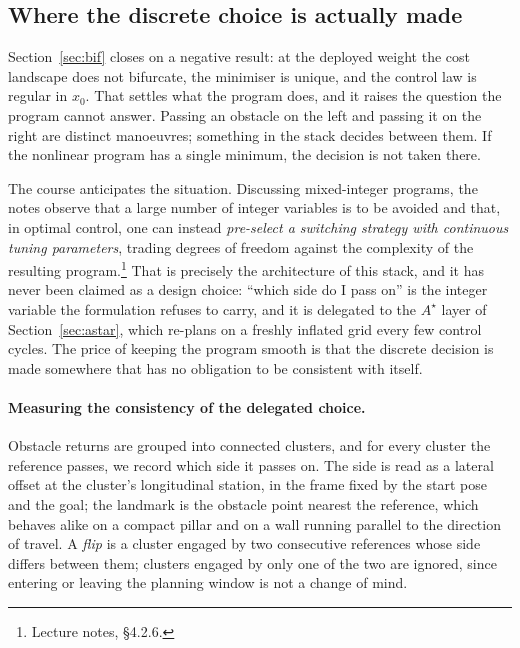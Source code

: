 \documentclass[11pt,a4paper]{article}
\newcommand{\astar}{$A^\star$}
\begin{document}
\subsection{Where the discrete choice is actually made}
\label{sec:homotopy}

Section~\ref{sec:bif} closes on a negative result: at the deployed weight the cost landscape does not
bifurcate, the minimiser is unique, and the control law is regular in $x_0$. That settles what the program
does, and it raises the question the program cannot answer. Passing an obstacle on the left and passing it on
the right are distinct manoeuvres; something in the stack decides between them. If the nonlinear program has
a single minimum, the decision is not taken there.

The course anticipates the situation. Discussing mixed-integer programs, the notes observe that a large
number of integer variables is to be avoided and that, in optimal control, one can instead
\emph{pre-select a switching strategy with continuous tuning parameters}, trading degrees of freedom against
the complexity of the resulting program.\footnote{Lecture notes, \S4.2.6.} That is precisely the architecture
of this stack, and it has never been claimed as a design choice: ``which side do I pass on'' is the integer
variable the formulation refuses to carry, and it is delegated to the \astar{} layer of
Section~\ref{sec:astar}, which re-plans on a freshly inflated grid every few control cycles. The price of
keeping the program smooth is that the discrete decision is made somewhere that has no obligation to be
consistent with itself.

\paragraph{Measuring the consistency of the delegated choice.}
Obstacle returns are grouped into connected clusters, and for every cluster the reference passes, we record
which side it passes on. The side is read as a lateral offset at the cluster's longitudinal station, in the
frame fixed by the start pose and the goal; the landmark is the obstacle point nearest the reference, which
behaves alike on a compact pillar and on a wall running parallel to the direction of travel. A \emph{flip} is
a cluster engaged by two consecutive references whose side differs between them; clusters engaged by only one
of the two are ignored, since entering or leaving the planning window is not a change of mind.
\end{document}
